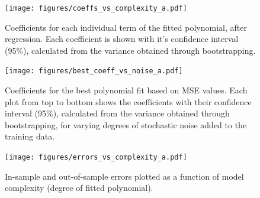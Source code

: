 \begin{figure}[h]
    \texttt{[image: figures/coeffs\_vs\_complexity\_a.pdf]}
    \caption{Coefficients for each individual term of the fitted polynomial, after regression. Each
	coefficient is shown with it's confidence interval (95\%), calculated from the variance obtained
	through bootstrapping.}
    \label{fig:ols-coeff-complexity}
\end{figure}

\begin{figure}[h]
    \texttt{[image: figures/best\_coeff\_vs\_noise\_a.pdf]}
    \caption{Coefficients for the best polynomial fit based on MSE values. Each plot from top to bottom
	shows the coefficients with their confidence interval (95\%), calculated from the variance obtained
	through bootstrapping, for varying degrees of stochastic noise added to the training data.}
    \label{fig:ols-coeff-noise}
\end{figure}

\begin{figure}[h]
    \texttt{[image: figures/errors\_vs\_complexity\_a.pdf]}
    \caption{In-sample and out-of-sample errors plotted as a function of model complexity (degree of fitted
	polynomial).}
    \label{fig:ols-errors-complexity}
\end{figure}
